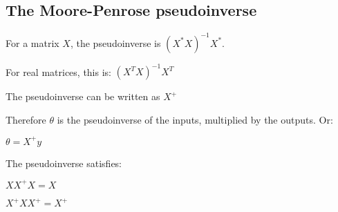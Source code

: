 
\subsection{The Moore-Penrose pseudoinverse}

For a matrix \(X\), the pseudoinverse is \((X^*X)^{-1}X^*\).

For real matrices, this is: \((X^TX)^{-1}X^T\)

The pseudoinverse can be written as \(X^+\)

Therefore \(\theta \) is the pseudoinverse of the inputs, multiplied by the outputs. Or:

\(\theta = X^+y\)

The pseudoinverse satisfies:

\(XX^+X=X\)

\(X^+XX^+=X^+\)


